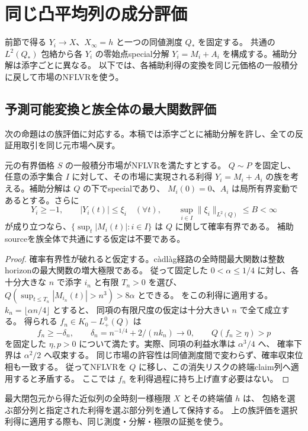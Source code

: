 \section{同じ凸平均列の成分評価}
\label{sec:components}
前節で得る $Y_i\to X$、$X_\infty=h$ と一つの同値測度 $Q_*$ を固定する。
共通の $L^2(Q_*)$ 包絡から各 $Y_i$ の零始点special分解
$Y_i=M_i+A_i$ を構成する。補助分解は添字ごとに異なる。
以下では、各補助利得の変換を同じ元価格の一般積分に戻して市場のNFLVRを使う。

\subsection{予測可能変換と族全体の最大関数評価}
次の命題は\cite[Lemma 4.7]{DS}の族評価に対応する。本稿では添字ごとに補助分解を許し、全ての反証用取引を同じ元市場へ戻す。

\begin{proposition}[元市場のNFLVRによる添字付き補助分解の評価]\label{prop:indexed-maximal}
元の有界価格 $S$ の一般積分市場がNFLVRを満たすとする。
$Q\sim P$ を固定し、任意の添字集合 $I$ に対して、その市場に実現される利得
$Y_i=M_i+A_i$ の族を考える。補助分解は $Q$ の下でspecialであり、
$M_i(0)=0$、$A_i$ は局所有界変動であるとする。さらに
\[
 Y_i\geq-1,\qquad |Y_i(t)|\leq \xi_i\quad(\forall t),\qquad
 \sup_{i\in I}\|\xi_i\|_{L^2(Q)}\leq B<\infty
\]
が成り立つなら、$\{\sup_t|M_i(t)|:i\in I\}$ は $Q$ に関して確率有界である。
補助sourceを族全体で共通にする仮定は不要である。
\end{proposition}
\begin{proof}
確率有界性が破れると仮定する。càdlàg経路の全時間最大関数は整数horizonの最大関数の増大極限である。
従って固定した $0<\alpha\leq1/4$ に対し、各十分大きな $n$ で添字 $i_n$ と有限 $T_n>0$ を選び、
$Q(\sup_{t\leq T_n}|M_{i_n}(t)|>n^3)>8\alpha$ とできる。
をこの利得に適用する。$k_n=\lfloor\alpha n/4\rfloor$ とすると、
同項の有限尺度の仮定は十分大きい $n$ で全て成立する。
得られる $f_n\in K_0-L^0_+(Q)$ は
\[
 f_n\geq-\delta_n,\qquad \delta_n=n^{-1/4}+2/(nk_n)\to0,
 \qquad Q(f_n\geq\eta)>p
\]
を固定した $\eta,p>0$ について満たす。実際、同項の利益水準は $\alpha^3/4$ へ、
確率下界は $\alpha^2/2$ へ収束する。
同じ市場の許容性は同値測度間で変わらず、確率収束位相も一致する。
従ってNFLVRを $Q$ に移し、この消失リスクの終端claim列へ適用すると矛盾する。
ここでは $f_n$ を利得過程に持ち上げ直す必要はない。
\end{proof}

最大閉包元から得た近似列の全時刻一様極限 $X$ とその終端値 $h$ は、
包絡を選ぶ部分列と指定された利得を選ぶ部分列を通して保持する。
上の族評価を選択利得に適用する際も、同じ測度・分解・極限の証拠を使う。

